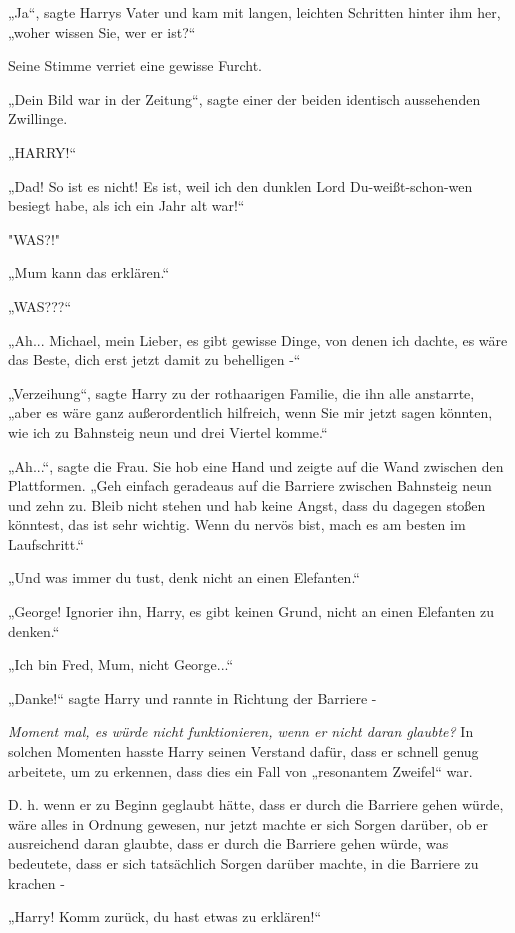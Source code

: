 {„Ja“, sagte Harrys Vater und kam mit langen, leichten Schritten hinter ihm her, „woher wissen Sie, wer er ist?“

Seine Stimme verriet eine gewisse Furcht.

„Dein Bild war in der Zeitung“, sagte einer der beiden identisch aussehenden Zwillinge.

„HARRY!“

„Dad! So ist es nicht! Es ist, weil ich den dunklen Lord Du-weißt-schon-wen besiegt habe, als ich ein Jahr alt war!“

"WAS?!"

„Mum kann das erklären.“

„WAS???“

„Ah... Michael, mein Lieber, es gibt gewisse Dinge, von denen ich dachte, es wäre das Beste, dich erst jetzt damit zu behelligen -“

„Verzeihung“, sagte Harry zu der rothaarigen Familie, die ihn alle anstarrte, „aber es wäre ganz außerordentlich hilfreich, wenn Sie mir jetzt sagen könnten, wie ich zu Bahnsteig neun und drei Viertel komme.“

„Ah...“, sagte die Frau. Sie hob eine Hand und zeigte auf die Wand zwischen den Plattformen. „Geh einfach geradeaus auf die Barriere zwischen Bahnsteig neun und zehn zu. Bleib nicht stehen und hab keine Angst, dass du dagegen stoßen könntest, das ist sehr wichtig. Wenn du nervös bist, mach es am besten im Laufschritt.“

„Und was immer du tust, denk nicht an einen Elefanten.“

„George! Ignorier ihn, Harry, es gibt keinen Grund, nicht an einen Elefanten zu denken.“

„Ich bin Fred, Mum, nicht George...“

„Danke!“ sagte Harry und rannte in Richtung der Barriere -

\emph{Moment mal, es würde nicht funktionieren, wenn er nicht daran glaubte?} In solchen Momenten hasste Harry seinen Verstand dafür, dass er schnell genug arbeitete, um zu erkennen, dass dies ein Fall von „resonantem Zweifel“ war.

D. h. wenn er zu Beginn geglaubt hätte, dass er durch die Barriere gehen würde, wäre alles in Ordnung gewesen, nur jetzt machte er sich Sorgen darüber, ob er ausreichend daran glaubte, dass er durch die Barriere gehen würde, was bedeutete, dass er sich tatsächlich Sorgen darüber machte, in die Barriere zu krachen -

„Harry! Komm zurück, du hast etwas zu erklären!“

}
